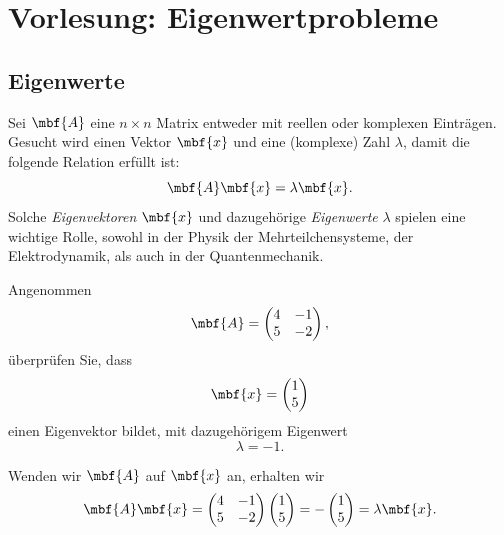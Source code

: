 
\section{Vorlesung: Eigenwertprobleme}
\subsection{Eigenwerte}

Sei $\mbf{A}$ eine $n\times n$ Matrix entweder mit reellen oder komplexen Einträgen. Gesucht wird einen Vektor $\mbf{x}$ und eine (komplexe) Zahl $\lambda$, damit die folgende Relation erfüllt ist:
\begin{equation}
  \mbf{A}\mbf{x} = \lambda \mbf{x}.
\end{equation}
Solche \emph{Eigenvektoren} $\mbf{x}$ und dazugehörige \emph{Eigenwerte} $\lambda$ spielen eine wichtige Rolle, sowohl in der Physik der Mehrteilchensysteme, der Elektrodynamik, als auch in der Quantenmechanik.

\begin{beispiel}
  Angenommen 
  \begin{equation}
    \mbf{A} = \begin{pmatrix}
      4 & -1 \\ 5 & -2
    \end{pmatrix},
  \end{equation}
  überprüfen Sie, dass 
  \begin{equation}
    \mbf{x} = \begin{pmatrix}
      1 \\ 5
    \end{pmatrix}
  \end{equation}
  einen Eigenvektor bildet, mit dazugehörigem Eigenwert
  \begin{equation}
    \lambda = -1.
  \end{equation}
\end{beispiel}
\begin{lösung}
  Wenden wir $\mbf{A}$ auf $\mbf{x}$ an, erhalten wir
  \begin{equation}
    \mbf{A}\mbf{x} = 
    \begin{pmatrix}
      4 & -1 \\ 5 & -2
    \end{pmatrix}\begin{pmatrix}
      1 \\ 5
    \end{pmatrix} = -\begin{pmatrix}
      1 \\ 5
    \end{pmatrix} = \lambda \mbf{x}.
  \end{equation}
\end{lösung}

